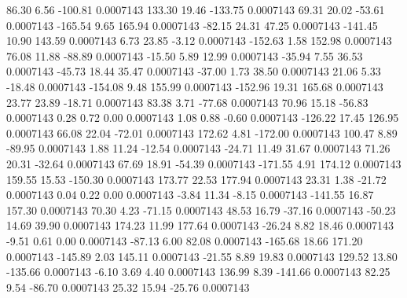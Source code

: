       86.30        6.56     -100.81     0.0007143
      133.30       19.46     -133.75     0.0007143
       69.31       20.02      -53.61     0.0007143
     -165.54        9.65      165.94     0.0007143
      -82.15       24.31       47.25     0.0007143
     -141.45       10.90      143.59     0.0007143
        6.73       23.85       -3.12     0.0007143
     -152.63        1.58      152.98     0.0007143
       76.08       11.88      -88.89     0.0007143
      -15.50        5.89       12.99     0.0007143
      -35.94        7.55       36.53     0.0007143
      -45.73       18.44       35.47     0.0007143
      -37.00        1.73       38.50     0.0007143
       21.06        5.33      -18.48     0.0007143
     -154.08        9.48      155.99     0.0007143
     -152.96       19.31      165.68     0.0007143
       23.77       23.89      -18.71     0.0007143
       83.38        3.71      -77.68     0.0007143
       70.96       15.18      -56.83     0.0007143
        0.28        0.72        0.00     0.0007143
        1.08        0.88       -0.60     0.0007143
     -126.22       17.45      126.95     0.0007143
       66.08       22.04      -72.01     0.0007143
      172.62        4.81     -172.00     0.0007143
      100.47        8.89      -89.95     0.0007143
        1.88       11.24      -12.54     0.0007143
      -24.71       11.49       31.67     0.0007143
       71.26       20.31      -32.64     0.0007143
       67.69       18.91      -54.39     0.0007143
     -171.55        4.91      174.12     0.0007143
      159.55       15.53     -150.30     0.0007143
      173.77       22.53      177.94     0.0007143
       23.31        1.38      -21.72     0.0007143
        0.04        0.22        0.00     0.0007143
       -3.84       11.34       -8.15     0.0007143
     -141.55       16.87      157.30     0.0007143
       70.30        4.23      -71.15     0.0007143
       48.53       16.79      -37.16     0.0007143
      -50.23       14.69       39.90     0.0007143
      174.23       11.99      177.64     0.0007143
      -26.24        8.82       18.46     0.0007143
       -9.51        0.61        0.00     0.0007143
      -87.13        6.00       82.08     0.0007143
     -165.68       18.66      171.20     0.0007143
     -145.89        2.03      145.11     0.0007143
      -21.55        8.89       19.83     0.0007143
      129.52       13.80     -135.66     0.0007143
       -6.10        3.69        4.40     0.0007143
      136.99        8.39     -141.66     0.0007143
       82.25        9.54      -86.70     0.0007143
       25.32       15.94      -25.76     0.0007143
